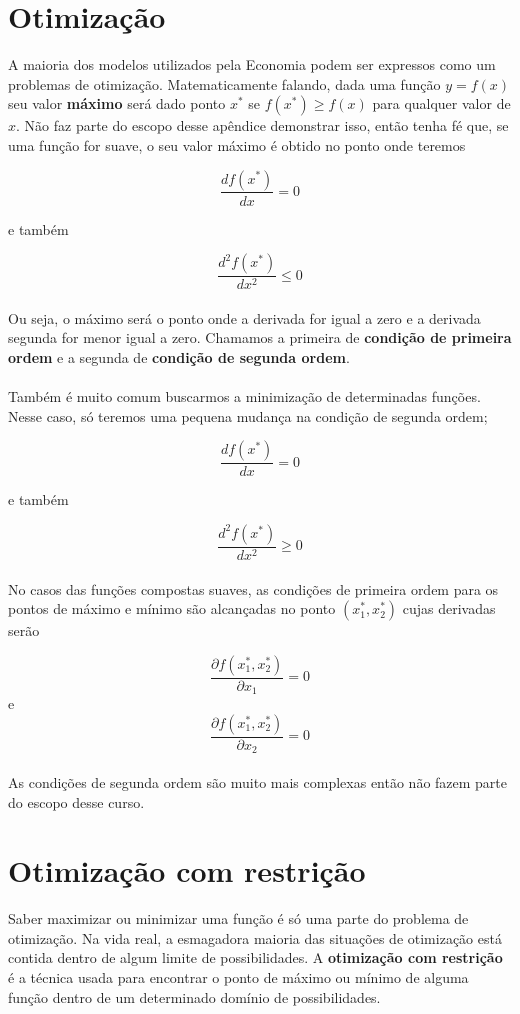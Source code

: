 \documentclass[a4paper,11pt,oneside]{book}
\theoremstyle{definition}
\theoremstyle{break}
\begin{document}
\section*{Otimização}

A maioria dos modelos utilizados pela Economia podem ser expressos como um problemas de otimização. Matematicamente falando, dada uma função $y = f(x)$ seu valor \textbf{máximo} será dado ponto $x^*$ se $f(x^*) \geqslant f(x)$ para qualquer valor de $x$. Não faz parte do escopo desse apêndice demonstrar isso, então tenha fé que, se uma função for suave, o seu valor máximo é obtido no ponto onde teremos

$$ \frac{df(x^*)}{dx} = 0 $$

e também

$$ \frac{d^2f(x^*)}{dx^2} \leq 0$$
\\
Ou seja, o máximo será o ponto onde a derivada for igual a zero e a derivada segunda for menor igual a zero. Chamamos a primeira de \textbf{condição de primeira ordem} e a segunda de \textbf{condição de segunda ordem}.
\\
\\
Também é muito comum buscarmos a minimização de determinadas funções. Nesse caso, só teremos uma pequena mudança na condição de segunda ordem;

$$ \frac{df(x^*)}{dx} = 0 $$

e também

$$ \frac{d^2f(x^*)}{dx^2} \geq 0$$
\\
No casos das funções compostas suaves, as condições de primeira ordem para os pontos de máximo e mínimo são alcançadas no ponto $(x_{1}^*,x_{2}^*)$ cujas derivadas serão

$$ \frac{\partial f(x_{1}^*,x_{2}^*)}{\partial x_1} = 0 $$
e
$$ \frac{\partial f(x_{1}^*,x_{2}^*)}{\partial x_2} = 0 $$
\\
As condições de segunda ordem são muito mais complexas então não fazem parte do escopo desse curso.

\section*{Otimização com restrição}

Saber maximizar ou minimizar uma função é só uma parte do problema de otimização. Na vida real, a esmagadora maioria das situações de otimização está contida dentro de algum limite de possibilidades. A \textbf{otimização com restrição} é a técnica usada para encontrar o ponto de máximo ou mínimo de alguma função dentro de um determinado domínio de possibilidades.
\end{document}
